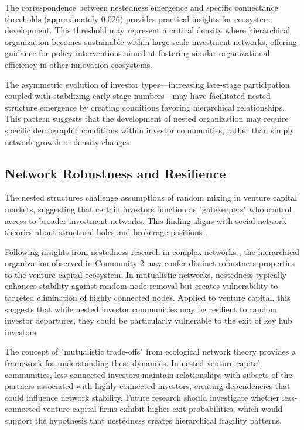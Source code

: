 The correspondence between nestedness emergence and specific connectance thresholds (approximately 0.026) provides practical insights for ecosystem development. This threshold may represent a critical density where hierarchical organization becomes sustainable within large-scale investment networks, offering guidance for policy interventions aimed at fostering similar organizational efficiency in other innovation ecosystems.

The asymmetric evolution of investor types—increasing late-stage participation coupled with stabilizing early-stage numbers—may have facilitated nested structure emergence by creating conditions favoring hierarchical relationships. This pattern suggests that the development of nested organization may require specific demographic conditions within investor communities, rather than simply network growth or density changes.

\subsection{Network Robustness and Resilience}

The nested structures challenge assumptions of random mixing in venture capital markets, suggesting that certain investors function as "gatekeepers" who control access to broader investment networks. This finding aligns with social network theories about structural holes and brokerage positions \cite{Borgatti2011}.

Following insights from nestedness research in complex networks \cite{Mariani2019}, the hierarchical organization observed in Community 2 may confer distinct robustness properties to the venture capital ecosystem. In mutualistic networks, nestedness typically enhances stability against random node removal but creates vulnerability to targeted elimination of highly connected nodes. Applied to venture capital, this suggests that while nested investor communities may be resilient to random investor departures, they could be particularly vulnerable to the exit of key hub investors.

The concept of "mutualistic trade-offs" from ecological network theory provides a framework for understanding these dynamics. In nested venture capital communities, less-connected investors maintain relationships with subsets of the partners associated with highly-connected investors, creating dependencies that could influence network stability. Future research should investigate whether less-connected venture capital firms exhibit higher exit probabilities, which would support the hypothesis that nestedness creates hierarchical fragility patterns.



